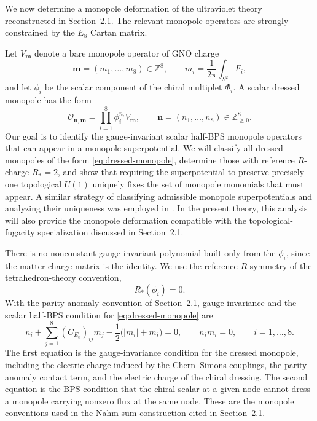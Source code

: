 \documentclass[11pt,a4paper]{article}
\numberwithin{equation}{section}
\begin{document}
We now determine a monopole deformation of the ultraviolet theory reconstructed in Section~2.1.  The relevant monopole operators are strongly constrained by the $E_8$ Cartan matrix.

Let $V_{\boldsymbol m}$ denote a bare monopole operator of GNO charge
\begin{equation}
  \boldsymbol m=(m_1,\ldots,m_8)\in\mathbb Z^8,
  \qquad
  m_i=\frac{1}{2\pi}\int_{S^2}F_i,
  \label{eq:monopole-flux}
\end{equation}
and let $\phi_i$ be the scalar component of the chiral multiplet $\Phi_i$.  A scalar dressed monopole has the form
\begin{equation}
  \mathcal O_{\boldsymbol n,\boldsymbol m}
  =\prod_{i=1}^{8}\phi_i^{n_i}V_{\boldsymbol m},
  \qquad
  \boldsymbol n=(n_1,\ldots,n_8)\in\mathbb Z_{\geq0}^{8}.
  \label{eq:dressed-monopole}
\end{equation}
Our goal is to identify the gauge-invariant scalar half-BPS monopole operators that can appear in a monopole superpotential.  We will classify all dressed monopoles of the form \eqref{eq:dressed-monopole}, determine those with reference $R$-charge $R_*=2$, and show that requiring the superpotential to preserve precisely one topological $U(1)$ uniquely fixes the set of monopole monomials that must appear.  A similar strategy of classifying admissible monopole superpotentials and analyzing their uniqueness was employed in \cite{Hamachika:2026whv}.  In the present theory, this analysis will also provide the monopole deformation compatible with the topological-fugacity specialization discussed in Section~2.1.

There is no nonconstant gauge-invariant polynomial built only from the $\phi_i$, since the matter-charge matrix is the identity.  We use the reference $R$-symmetry of the tetrahedron-theory convention,
\begin{equation}
  R_*(\phi_i)=0.
  \label{eq:Rstar-chiral}
\end{equation}
With the parity-anomaly convention of Section~2.1, gauge invariance and the scalar half-BPS condition for \eqref{eq:dressed-monopole} are
\begin{equation}
  n_i+\sum_{j=1}^{8}(C_{E_8})_{ij}m_j
  -\frac12\bigl(|m_i|+m_i\bigr)=0,
  \qquad
  n_i m_i=0,
  \qquad i=1,\ldots,8.
  \label{eq:monopole-conditions}
\end{equation}
The first equation is the gauge-invariance condition for the dressed monopole, including the electric charge induced by the Chern--Simons couplings, the parity-anomaly contact term, and the electric charge of the chiral dressing.  The second equation is the BPS condition that the chiral scalar at a given node cannot dress a monopole carrying nonzero flux at the same node.  These are the monopole conventions used in the Nahm-sum construction cited in Section~2.1.
\end{document}
